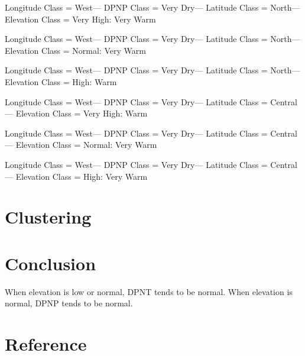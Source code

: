 \documentclass[11pt]{article}
\begin{document}
Longitude Class = West--- DPNP Class = Very Dry--- Latitude Class = North--- Elevation Class = Very High:  Very Warm

Longitude Class = West--- DPNP Class = Very Dry--- Latitude Class = North--- Elevation Class = Normal:  Very Warm

Longitude Class = West--- DPNP Class = Very Dry--- Latitude Class = North--- Elevation Class = High:  Warm

Longitude Class = West--- DPNP Class = Very Dry--- Latitude Class = Central--- Elevation Class = Very High:  Warm

Longitude Class = West--- DPNP Class = Very Dry--- Latitude Class = Central--- Elevation Class = Normal:  Very Warm

Longitude Class = West--- DPNP Class = Very Dry--- Latitude Class = Central--- Elevation Class = High:  Very Warm


\section{Clustering}


\section{Conclusion}
When elevation is low or normal, DPNT tends to be normal. When elevation is normal, DPNP tends to be normal.

\section{Reference}


\end{document}
